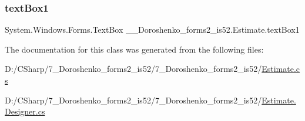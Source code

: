 \subsubsection{\texorpdfstring{text\+Box1}{textBox1}}
{\footnotesize\ttfamily System.\+Windows.\+Forms.\+Text\+Box \+\_\+\_\+\+Doroshenko\+\_\+forms2\+\_\+is52.\+Estimate.\+text\+Box1\hspace{0.3cm}{\ttfamily [private]}}



The documentation for this class was generated from the following files\+:\begin{DoxyCompactItemize}
\item 
D\+:/\+C\+Sharp/7\+\_\+\+Doroshenko\+\_\+forms2\+\_\+is52/7\+\_\+\+Doroshenko\+\_\+forms2\+\_\+is52/\hyperlink{_estimate_8cs}{Estimate.\+cs}\item 
D\+:/\+C\+Sharp/7\+\_\+\+Doroshenko\+\_\+forms2\+\_\+is52/7\+\_\+\+Doroshenko\+\_\+forms2\+\_\+is52/\hyperlink{_estimate_8_designer_8cs}{Estimate.\+Designer.\+cs}\end{DoxyCompactItemize}
